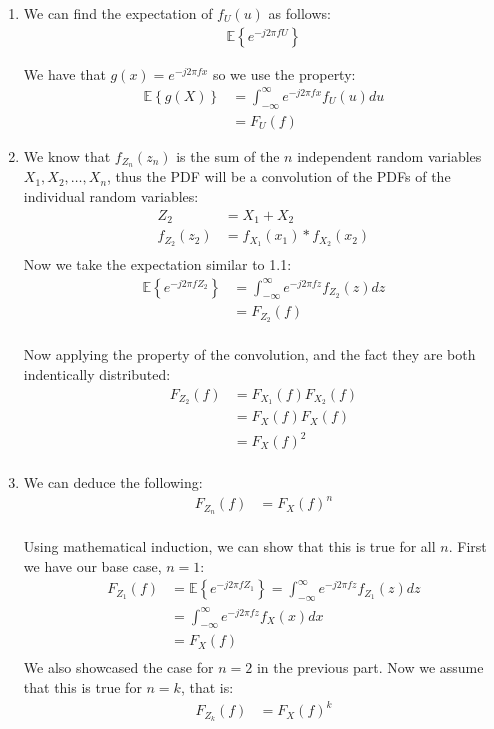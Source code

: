 \documentclass{article}
\begin{document}
\begin{enumerate}[label=1.\arabic*]
    \item We can find the expectation of $f_U(u)$ as follows:
    \begin{align*}
        \mathbb{E}\left\{e^{-j2\pi f U}\right\}
    \end{align*}

    We have that $g(x) = e^{-j2\pi f x}$ so we use the property:
    \begin{align*}
        \mathbb{E}\left\{g(X)\right\} &= \int_{-\infty}^{\infty} e^{-j2\pi f x} f_U(u) du \\
        &= F_U(f)
    \end{align*}
    \item We know that $f_{Z_{n}}(z_n)$ is the sum of the $n$ independent random variables $X_1, X_2, \ldots, X_n$, thus the PDF will be a convolution of the PDFs of the individual random variables:
    \begin{align*}
        Z_{2} &= X_1 + X_2 \\
        f_{Z_2}(z_2) &= f_{X_1}(x_1) * f_{X_2}(x_2) \\
    \end{align*}
    Now we take the expectation similar to 1.1:
    \begin{align*}
       \mathbb{E}\left\{e^{-j2\pi f Z_2}\right\} &= \int_{-\infty}^{\infty} e^{-j2\pi f z} f_{Z_2}(z) dz \\
       &= F_{Z_2}(f) \\
    \end{align*}

    Now applying the property of the convolution, and the fact they are both indentically distributed:
    \begin{align*}
        F_{Z_2}(f) &= F_{X_1}(f)F_{X_2}(f) \\
        &= F_{X}(f)F_{X}(f) \\
        &= F_{X}(f)^2 \\
    \end{align*}

    \item We can deduce the following:
    \begin{align*}
        F_{Z_n}(f) &= F_{X}(f)^n \\
    \end{align*}

    Using mathematical induction, we can show that this is true for all $n$. First we have our base case, $n = 1$:
    \begin{align*}
        F_{Z_1}(f) &= \mathbb{E}\left\{e^{-j2\pi f Z_1}\right\} = \int_{-\infty}^{\infty} e^{-j2\pi f z} f_{Z_1}(z) dz \\
        &= \int_{-\infty}^{\infty} e^{-j2\pi f z} f_{X}(x) dx \\
        &= F_{X}(f) \\
    \end{align*}
    We also showcased the case for $n=2$ in the previous part. Now we assume that this is true for $n = k$, that is:
    \begin{align*}
        F_{Z_k}(f) &= F_{X}(f)^k \\
    \end{align*}


\end{enumerate}
\end{document}
